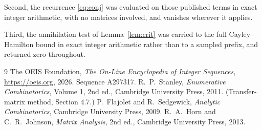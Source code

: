 \documentclass[11pt,a4paper]{article}
\theoremstyle{plain}
\theoremstyle{definition}
\begin{document}
Second, the recurrence \eqref{eq:conj} was evaluated on those published terms in exact
integer arithmetic, with no matrices involved, and vanishes wherever it applies.

Third, the annihilation test of Lemma~\ref{lem:crit} was carried to the full
Cayley--Hamilton bound in exact integer arithmetic rather than to a sampled prefix, and
returned zero throughout.

\begin{thebibliography}{9}
 The OEIS Foundation, \emph{The On-Line Encyclopedia of Integer
Sequences}, \url{https://oeis.org}, 2026. Sequence A297317.
 R.~P.~Stanley, \emph{Enumerative Combinatorics}, Volume 1, 2nd ed.,
Cambridge University Press, 2011. (Transfer-matrix method, Section 4.7.)
 P.~Flajolet and R.~Sedgewick, \emph{Analytic Combinatorics}, Cambridge
University Press, 2009.
 R.~A.~Horn and C.~R.~Johnson, \emph{Matrix Analysis}, 2nd ed., Cambridge
University Press, 2013.
\end{thebibliography}
\end{document}
